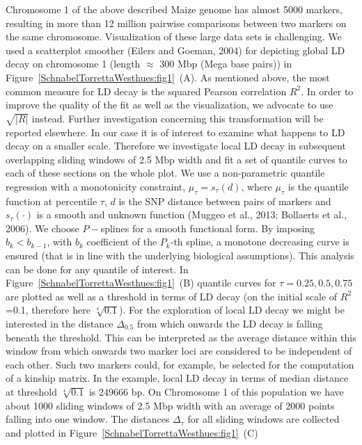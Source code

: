 \documentclass[twoside]{report}
\begin{document}
Chromosome 1 of the above described 
Maize genome has almost 5000 markers, resulting in more than 
12 million pairwise comparisons 
	between two markers on the same chromosome. Visualization of these large data sets is 
	challenging. We used a scatterplot smoother (Eilers and Goeman, 2004) for depicting
	global LD decay on chromosome 1 (length $\approx$ 300 Mbp (Mega base pairs))   
	in Figure~\ref{SchnabelTorrettaWesthues:fig1}~(A). As mentioned above, the most 
	common measure for LD decay is the squared Pearson correlation $R^2$. In order to improve the 
	quality of the fit as well as the visualization, we advocate to use $\sqrt{|R|}$ instead. Further 
	investigation concerning this transformation will be reported elsewhere. 
	In our case it is of interest to examine what happens to 
	LD decay on a smaller scale. Therefore we investigate local LD decay in subsequent 
	overlapping sliding windows of 2.5 Mbp width and fit a set of quantile curves to each of these 
	sections on the whole plot.  
	We use a non-parametric quantile 
	regression with a monotonicity constraint,
	$\mu_{\tau}=s_{\tau}(d)$, where $\mu_\tau$ is the quantile function at 
	percentile $\tau$, $d$ is the SNP distance between pairs of markers and 
	$s_{\tau}(\cdot)$ is a smooth and unknown function (Muggeo et al., 2013; Bollaerts et al., 2006). 
	We choose $P-$splines for a smooth functional form. By imposing 
	$b_k<b_{k-1}$, with $b_{k}$ coefficient of the $P_k$-th spline, 
	a monotone decreasing curve is ensured (that is 
	in line with the underlying biological assumptions). This analysis can be done for any quantile 
	of interest. In Figure~\ref{SchnabelTorrettaWesthues:fig1}~(B) quantile curves for 
	$\tau={0.25,0.5,0.75}$ are 
	plotted as well as a threshold in terms of LD decay (on the initial scale 
	of $R^2$=0.1, therefore here $\sqrt[4]{0.1}$). For the exploration of local LD decay 
	we might be interested in the distance $\Delta_{0.5}$ from 
	which onwards the LD decay is falling beneath the threshold. This can be interpreted as the
	average distance within this window from which onwards two marker loci are considered to be 
	independent of each other. Such two markers could, for example, be selected for the computation
	of a kinship matrix. In the example, local 
		LD decay in terms of median distance at threshold $\sqrt[4]{0.1}$ is 249666 bp. 
	On Chromosome 1 of this population we have about 1000 sliding windows
	 of 2.5 Mbp width with an 
	average of 2000 points falling into one window. The distances 
	$\Delta_{\tau}$ for all sliding windows are collected and plotted 
	in Figure~\ref{SchnabelTorrettaWesthues:fig1}~(C) 
\end{document}
